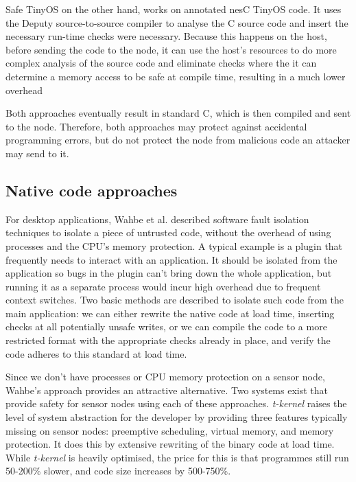 Safe TinyOS on the other hand, works on annotated nesC TinyOS code. It uses the Deputy \cite{Condit:2007uo} source-to-source compiler to analyse the C source code and insert the necessary run-time checks were necessary. Because this happens on the host, before sending the code to the node, it can use the host's resources to do more complex analysis of the source code and eliminate checks where the it can determine a memory access to be safe at compile time, resulting in a much lower overhead

Both approaches eventually result in standard C, which is then compiled and sent to the node. Therefore, both approaches may protect against accidental programming errors, but do not protect the node from malicious code an attacker may send to it.

\subsection{Native code approaches}
For desktop applications, Wahbe et al. described software fault isolation \cite{Wahbe:1994cj} techniques to isolate a piece of untrusted code, without the overhead of using processes and the CPU's memory protection. A typical example is a plugin that frequently needs to interact with an application. It should be isolated from the application so bugs in the plugin can't bring down the whole application, but running it as a separate process would incur high overhead due to frequent context switches. Two basic methods are described to isolate such code from the main application: we can either rewrite the native code at load time, inserting checks at all potentially unsafe writes, or we can compile the code to a more restricted format with the appropriate checks already in place, and verify the code adheres to this standard at load time.

Since we don't have processes or CPU memory protection on a sensor node, Wahbe's approach provides an attractive alternative. Two systems exist that provide safety for sensor nodes using each of these approaches. \emph{t-kernel} raises the level of system abstraction for the developer by providing three features typically missing on sensor nodes: preemptive scheduling, virtual memory, and memory protection. It does this by extensive rewriting of the binary code at load time. While \emph{t-kernel} is heavily optimised, the price for this is that programmes still run 50-200\% slower, and code size increases by 500-750\%.

